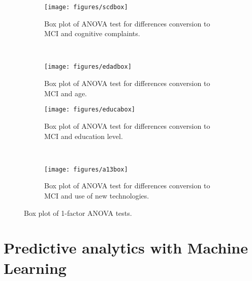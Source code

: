 \documentclass[11pt]{article}
\theoremstyle{definition}
\theoremstyle{remark}
\begin{document}
\begin{figure}[H]
    \centering
    \begin{subfigure}[t]{0.45\textwidth}
        \centering
        \texttt{[image: figures/scdbox]}
        \caption{Box plot of ANOVA test for differences conversion to MCI and cognitive complaints.}
    \end{subfigure}
    ~ 
    \begin{subfigure}[t]{0.45\textwidth}
        \centering
        \texttt{[image: figures/edadbox]}
        \caption{Box plot of ANOVA test for differences conversion to MCI and age.}
    \end{subfigure}%
    
     \begin{subfigure}[t]{0.45\textwidth}
        \centering
        \texttt{[image: figures/educabox]}
        \caption{Box plot of ANOVA test for differences conversion to MCI and education level.}
    \end{subfigure}
    ~ 
    \begin{subfigure}[t]{0.45\textwidth}
        \centering
        \texttt{[image: figures/a13box]}
        \caption{Box plot of ANOVA test for differences conversion to MCI and use of new technologies.}
    \end{subfigure}%
    \caption{Box plot of 1-factor ANOVA tests.} \label{fig:anovabox}
\end{figure}

\newpage
\section{Predictive analytics with Machine Learning} 
\label{se:mod}
\end{document}
